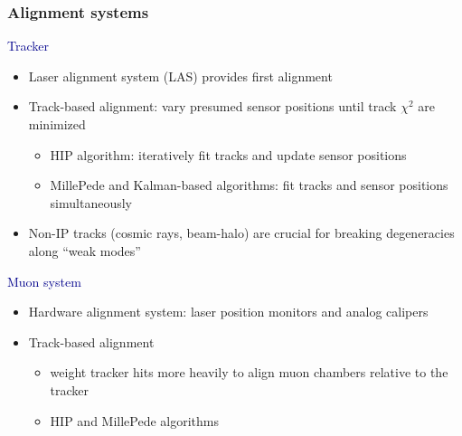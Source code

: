 \documentclass[compress]{beamer}
\begin{document}
\begin{frame}
\frametitle{Alignment systems}

\textcolor{darkblue}{Tracker}
\begin{itemize}
\item Laser alignment system (LAS) provides first alignment
\item Track-based alignment: vary presumed sensor positions until track $\chi^2$ are minimized
\begin{itemize}
\item HIP algorithm: iteratively fit tracks and update sensor positions
\item MillePede and Kalman-based algorithms: fit tracks and sensor positions simultaneously
\end{itemize}
\item Non-IP tracks (cosmic rays, beam-halo) are crucial for breaking degeneracies along ``weak modes''
\end{itemize}

\textcolor{darkblue}{Muon system}
\begin{itemize}
\item Hardware alignment system: laser position monitors and analog calipers
\item Track-based alignment
\begin{itemize}
\item weight tracker hits more heavily to align muon chambers relative to the tracker
\item HIP and MillePede algorithms
\end{itemize}
\end{itemize}

\end{frame}
\end{document}
